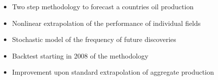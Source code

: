 \documentclass[11pt,twoside,a4paper]{article}
\begin{document}
\begin{itemize}
  \item Two step methodology to forecast a countries oil production
  \item Nonlinear extrapolation of the performance of individual fields
  \item Stochastic model of the frequency of future discoveries
  \item Backtest starting in 2008 of the methodology
  \item Improvement upon standard extrapolation of aggregate production
\end{itemize}
\end{document}

